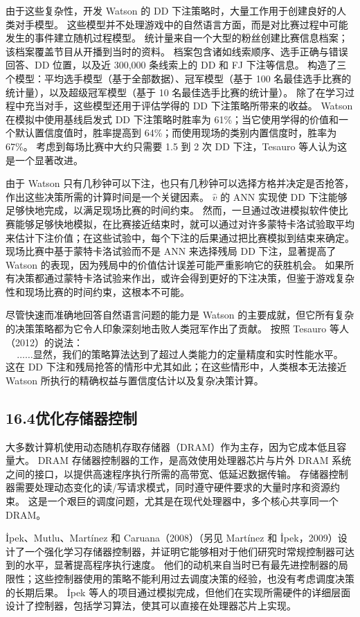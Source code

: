 \documentclass[UTF8,12pt,a4paper,fontset=fandol]{ctexart}
\begin{document}
由于这些复杂性，开发 Watson 的 DD 下注策略时，大量工作用于创建良好的人类对手模型。
这些模型并不处理游戏中的自然语言方面，而是对比赛过程中可能发生的事件建立随机过程模型。
统计量来自一个大型的粉丝创建比赛信息档案；该档案覆盖节目从开播到当时的资料。
档案包含诸如线索顺序、选手正确与错误回答、DD 位置，以及近 300,000 条线索上的 DD 和 FJ 下注等信息。
构造了三个模型：平均选手模型（基于全部数据）、冠军模型（基于 100 名最佳选手比赛的统计量），以及超级冠军模型（基于 10 名最佳选手比赛的统计量）。
除了在学习过程中充当对手，这些模型还用于评估学得的 DD 下注策略所带来的收益。
Watson 在模拟中使用基线启发式 DD 下注策略时胜率为 61\%；当它使用学得的价值和一个默认置信度值时，胜率提高到 64\%；而使用现场的类别内置信度时，胜率为 67\%。
考虑到每场比赛中大约只需要 1.5 到 2 次 DD 下注，Tesauro 等人认为这是一个显著改进。

由于 Watson 只有几秒钟可以下注，也只有几秒钟可以选择方格并决定是否抢答，作出这些决策所需的计算时间是一个关键因素。
$\hat v$ 的 ANN 实现使 DD 下注能够足够快地完成，以满足现场比赛的时间约束。
然而，一旦通过改进模拟软件使比赛能够足够快地模拟，在比赛接近结束时，就可以通过对许多蒙特卡洛试验取平均来估计下注价值；在这些试验中，每个下注的后果通过把比赛模拟到结束来确定。
现场比赛中基于蒙特卡洛试验而不是 ANN 来选择残局 DD 下注，显著提高了 Watson 的表现，因为残局中的价值估计误差可能严重影响它的获胜机会。
如果所有决策都通过蒙特卡洛试验来作出，或许会得到更好的下注决策，但鉴于游戏复杂性和现场比赛的时间约束，这根本不可能。

尽管快速而准确地回答自然语言问题的能力是 Watson 的主要成就，但它所有复杂的决策策略都为它令人印象深刻地击败人类冠军作出了贡献。
按照 Tesauro 等人（2012）的说法：
\[
\text{……显然，我们的策略算法达到了超过人类能力的定量精度和实时性能水平。}
\]
这在 DD 下注和残局抢答的情形中尤其如此；在这些情形中，人类根本无法接近 Watson 所执行的精确权益与置信度估计以及复杂决策计算。

\subsection*{16.4\quad 优化存储器控制}

大多数计算机使用动态随机存取存储器（DRAM）作为主存，因为它成本低且容量大。
DRAM 存储器控制器的工作，是高效使用处理器芯片与片外 DRAM 系统之间的接口，以提供高速程序执行所需的高带宽、低延迟数据传输。
存储器控制器需要处理动态变化的读/写请求模式，同时遵守硬件要求的大量时序和资源约束。
这是一个艰巨的调度问题，尤其是在现代处理器中，多个核心共享同一个 DRAM。

\.{I}pek、Mutlu、Mart\'inez 和 Caruana（2008）（另见 Mart\'inez 和 \.{I}pek，2009）设计了一个强化学习存储器控制器，并证明它能够相对于他们研究时常规控制器可达到的水平，显著提高程序执行速度。
他们的动机来自当时已有最先进控制器的局限性；这些控制器使用的策略不能利用过去调度决策的经验，也没有考虑调度决策的长期后果。
\.{I}pek 等人的项目通过模拟完成，但他们在实现所需硬件的详细层面设计了控制器，包括学习算法，使其可以直接在处理器芯片上实现。
\end{document}
